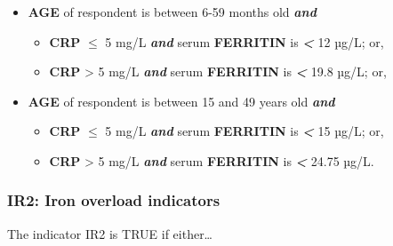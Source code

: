 \documentclass[12pt,a4paper]{article}
\begin{document}
\begin{itemize}
\item
  \textbf{AGE} of respondent is between 6-59 months old \textbf{\emph{and}}

  \begin{itemize}
  \item
    \textbf{CRP} \textbf{\emph{\(\leq\)}} 5 mg/L \textbf{\emph{and}} serum \textbf{FERRITIN} is \textbf{\emph{\textless{}}} 12 µg/L; or,
  \item
    \textbf{CRP} \textgreater{} 5 mg/L \textbf{\emph{and}} serum \textbf{FERRITIN} is \textbf{\emph{\textless{}}} 19.8 µg/L; or,
  \end{itemize}
\item
  \textbf{AGE} of respondent is between 15 and 49 years old \textbf{\emph{and}}

  \begin{itemize}
  \item
    \textbf{CRP} \textbf{\emph{\(\leq\)}} 5 mg/L \textbf{\emph{and}} serum \textbf{FERRITIN} is \textbf{\emph{\textless{}}} 15 µg/L; or,
  \item
    \textbf{CRP} \textgreater{} 5 mg/L \textbf{\emph{and}} serum \textbf{FERRITIN} is \textbf{\emph{\textless{}}} 24.75 µg/L.
  \end{itemize}
\end{itemize}

\hypertarget{ir2-iron-overload-indicators}{%
\subsubsection{IR2: Iron overload indicators}\label{ir2-iron-overload-indicators}}

The indicator IR2 is TRUE if either\ldots{}
\end{document}
